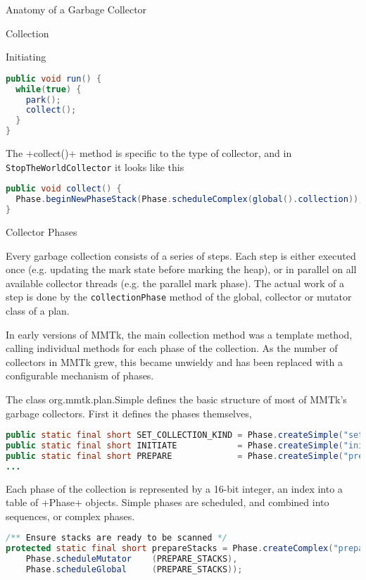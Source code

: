\begin{section}{Anatomy of a Garbage Collector}
\begin{subsection}{Collection}
\begin{subsubsection}{Initiating}
\begin{lstlisting}[language=Java,title=ParallelCollector]
public void run() {
  while(true) {
    park();
    collect();
  }
}
\end{lstlisting}

The \spverb+collect()+ method is specific to the type of collector, and in \texttt{StopTheWorldCollector} it looks like this
\begin{lstlisting}[language=Java,title=StopTheWorldCollector]
public void collect() {
  Phase.beginNewPhaseStack(Phase.scheduleComplex(global().collection));
}
\end{lstlisting}

\end{subsubsection}

\begin{subsubsection}{Collector Phases}

Every garbage collection consists of a series of steps.  Each step is either executed once (e.g. updating the mark state before marking the heap), or in parallel on all available collector threads (e.g. the parallel mark phase).  The actual work of a step is done by the \texttt{collectionPhase} method of the global, collector or mutator class of a plan.

In early versions of MMTk, the main collection method was a template method, calling individual methods for each phase of the collection.  As the number of collectors in MMTk grew, this became unwieldy and has been replaced with a configurable mechanism of phases.  

The class org.mmtk.plan.Simple defines the basic structure of most of MMTk's garbage collectors.  First it defines the phases themselves,

\begin{lstlisting}[language=Java,title=Simple.java]
public static final short SET_COLLECTION_KIND = Phase.createSimple("set-collection-kind", null);
public static final short INITIATE            = Phase.createSimple("initiate", null);
public static final short PREPARE             = Phase.createSimple("prepare");
...
\end{lstlisting}

Each phase of the collection is represented by a 16-bit integer, an index into a table of \spverb+Phase+ objects.  Simple phases are scheduled, and combined into sequences, or complex phases.

\begin{lstlisting}[language=Java,title=Simple.java]
/** Ensure stacks are ready to be scanned */
protected static final short prepareStacks = Phase.createComplex("prepare-stacks", null,
    Phase.scheduleMutator    (PREPARE_STACKS),
    Phase.scheduleGlobal     (PREPARE_STACKS));
\end{lstlisting}


\end{subsubsection}
\end{subsection}
\end{section}
